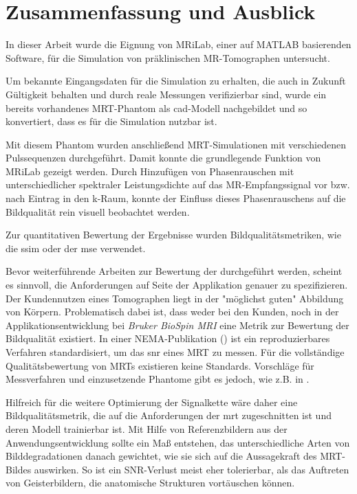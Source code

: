 \chapter{Zusammenfassung und Ausblick}
In dieser Arbeit wurde die Eignung von MRiLab, einer auf MATLAB basierenden Software, für die Simulation von präklinischen MR-Tomographen untersucht.

Um bekannte Eingangsdaten für die Simulation zu erhalten, die auch in Zukunft Gültigkeit behalten und durch reale Messungen verifizierbar sind, wurde ein bereits vorhandenes MRT-Phantom als \gls{cad}-Modell nachgebildet und so konvertiert, dass es für die Simulation nutzbar ist.

Mit diesem Phantom wurden anschließend MRT-Simulationen mit verschiedenen Pulssequenzen durchgeführt. Damit konnte die grundlegende Funktion von MRiLab gezeigt werden. Durch Hinzufügen von Phasenrauschen mit unterschiedlicher spektraler Leistungsdichte auf das MR-Empfangssignal vor bzw. nach Eintrag in den k-Raum, konnte der Einfluss dieses Phasenrauschens auf die Bildqualität rein visuell beobachtet werden.

Zur quantitativen Bewertung der Ergebnisse wurden Bildqualitätsmetriken, wie die \gls{ssim} oder der \gls{mse} verwendet.

Bevor weiterführende Arbeiten zur Bewertung der durchgeführt werden, scheint es sinnvoll, die Anforderungen auf Seite der Applikation genauer zu spezifizieren. Der Kundennutzen eines Tomographen liegt in der "möglichst guten" Abbildung von Körpern. Problematisch dabei ist, dass weder bei den Kunden, noch in der Applikationsentwicklung bei \textit{Bruker BioSpin MRI} eine Metrik zur Bewertung der Bildqualität existiert. In einer NEMA-Publikation (\cite{nemaSNR}) ist ein reproduzierbares Verfahren standardisiert, um das \gls{snr} eines MRT zu messen. Für die vollständige Qualitätsbewertung von MRTs existieren keine Standards. Vorschläge für Messverfahren und einzusetzende Phantome gibt es jedoch, wie z.B. in \cite{aapm1990}.

Hilfreich für die weitere Optimierung der Signalkette wäre daher eine Bildqualitätsmetrik, die auf die Anforderungen der \gls{mrt} zugeschnitten ist und deren Modell trainierbar ist. Mit Hilfe von Referenzbildern aus der Anwendungsentwicklung sollte ein Maß entstehen, das unterschiedliche Arten von Bilddegradationen danach gewichtet, wie sie sich auf die Aussagekraft des MRT-Bildes auswirken. So ist ein SNR-Verlust meist eher tolerierbar, als das Auftreten von Geisterbildern, die anatomische Strukturen vortäuschen können. 
